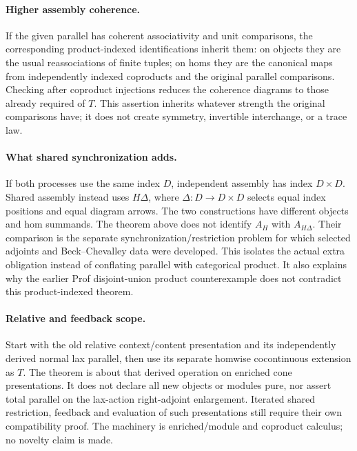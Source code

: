 \documentclass{article}
\begin{document}
\paragraph{Higher assembly coherence.} If the given parallel has coherent associativity and unit comparisons, the corresponding product-indexed identifications inherit them: on objects they are the usual reassociations of finite tuples; on homs they are the canonical maps from independently indexed coproducts and the original parallel comparisons. Checking after coproduct injections reduces the coherence diagrams to those already required of $T$. This assertion inherits whatever strength the original comparisons have; it does not create symmetry, invertible interchange, or a trace law.

\paragraph{What shared synchronization adds.} If both processes use the same index $D$, independent assembly has index $D\times D$. Shared assembly instead uses $H\Delta$, where $\Delta:D\to D\times D$ selects equal index positions and equal diagram arrows. The two constructions have different objects and hom summands. The theorem above does not identify $A_H$ with $A_{H\Delta}$. Their comparison is the separate synchronization/restriction problem for which selected adjoints and Beck--Chevalley data were developed. This isolates the actual extra obligation instead of conflating parallel with categorical product. It also explains why the earlier Prof disjoint-union product counterexample does not contradict this product-indexed theorem.

\paragraph{Relative and feedback scope.} Start with the old relative context/content presentation and its independently derived normal lax parallel, then use its separate homwise cocontinuous extension as $T$. The theorem is about that derived operation on enriched cone presentations. It does not declare all new objects or modules pure, nor assert total parallel on the lax-action right-adjoint enlargement. Iterated shared restriction, feedback and evaluation of such presentations still require their own compatibility proof. The machinery is enriched/module and coproduct calculus; no novelty claim is made.
\end{document}
